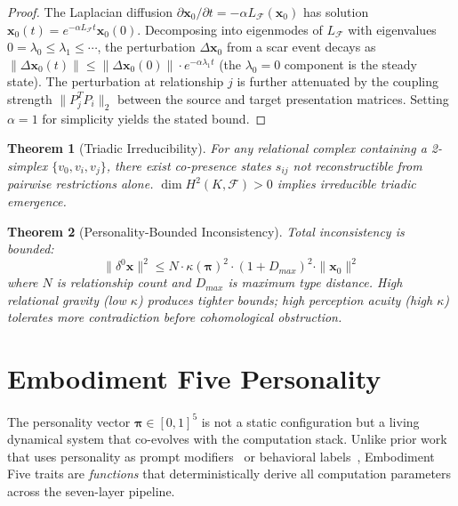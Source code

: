 \documentclass[11pt]{article}
\newtheorem{theorem}{Theorem}[section]
\begin{document}
\begin{proof}
The Laplacian diffusion $\partial \mathbf{x}_0 / \partial t = -\alpha L_\mathcal{F}(\mathbf{x}_0)$ has solution $\mathbf{x}_0(t) = e^{-\alpha L_\mathcal{F} t} \mathbf{x}_0(0)$. Decomposing into eigenmodes of $L_\mathcal{F}$ with eigenvalues $0 = \lambda_0 \leq \lambda_1 \leq \cdots$, the perturbation $\Delta \mathbf{x}_0$ from a scar event decays as $\|\Delta \mathbf{x}_0(t)\| \leq \|\Delta \mathbf{x}_0(0)\| \cdot e^{-\alpha \lambda_1 t}$ (the $\lambda_0 = 0$ component is the steady state). The perturbation at relationship $j$ is further attenuated by the coupling strength $\|P_j^T P_i\|_2$ between the source and target presentation matrices. Setting $\alpha = 1$ for simplicity yields the stated bound.
\end{proof}

\begin{theorem}[Triadic Irreducibility]
\label{thm:sheaf-triadic}
For any relational complex containing a 2-simplex $\{v_0, v_i, v_j\}$, there exist co-presence states $s_{ij}$ not reconstructible from pairwise restrictions alone. $\dim H^2(K, \mathcal{F}) > 0$ implies irreducible triadic emergence.
\end{theorem}

\begin{theorem}[Personality-Bounded Inconsistency]
\label{thm:sheaf-personality}
Total inconsistency is bounded:
\begin{equation}
\|\delta^0 \mathbf{x}\|^2 \leq N \cdot \kappa(\boldsymbol{\pi})^2 \cdot (1 + D_{max})^2 \cdot \|\mathbf{x}_0\|^2
\end{equation}
where $N$ is relationship count and $D_{max}$ is maximum type distance. High relational gravity (low $\kappa$) produces tighter bounds; high perception acuity (high $\kappa$) tolerates more contradiction before cohomological obstruction.
\end{theorem}

\section{Embodiment Five Personality}
\label{sec:personality}

The personality vector $\boldsymbol{\pi} \in [0,1]^5$ is not a static configuration but a living dynamical system that co-evolves with the computation stack. Unlike prior work that uses personality as prompt modifiers~\cite{structured2025} or behavioral labels~\cite{evolving2024}, Embodiment Five traits are \emph{functions} that deterministically derive all computation parameters across the seven-layer pipeline.
\end{document}
